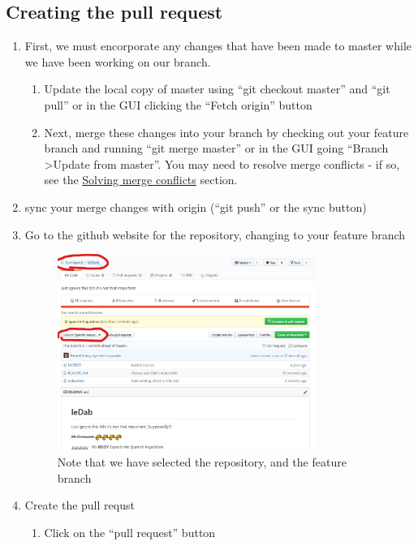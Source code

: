 \documentclass[11pt, titlepage]{article}
\begin{document}
\subsection{Creating the pull request}
\label{BPRW_creating_pull_request}
\begin{enumerate}
	\item First, we must encorporate any changes that have been made to master while we have been working on our branch.
	\begin{enumerate}
		\item Update the local copy of master using ``git checkout master'' and ``git pull'' or in the GUI clicking the ``Fetch origin'' button
		\item Next, merge these changes into your branch by checking out your feature branch and running ``git merge master'' or in the GUI going ``Branch \textgreater Update from master''. You may need to resolve merge conflicts - if so, see the \hyperref[sec:solving_merge_conflicts]{Solving merge conflicts} section.
	\end{enumerate}
	\item sync your merge changes with origin (``git push'' or the sync button)
	\item Go to the github website for the repository, changing to your feature branch
	\begin{figure}[H]
		\centering
		\includegraphics[width=0.8\textwidth]{BPRW/3github-website}
		\caption{Note that we have selected the repository, and the feature branch}
	\end{figure}
	\item Create the pull requst
	\begin{enumerate}
		\item Click on the ``pull request'' button
		\begin{figure}[H]

\end{figure}
\end{enumerate}
\end{enumerate}
\end{document}

